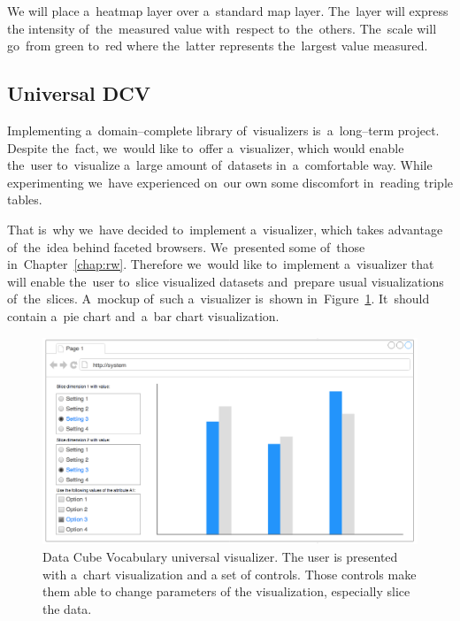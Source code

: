 We will place a~heatmap layer over a~standard map layer. The~layer will express 
the intensity of~the~measured value with~respect to~the~others. The~scale will go~from 
green to~red where the~latter represents the~largest value measured.

\subsection{Universal DCV}
Implementing a~domain--complete library of~visualizers is~a~long--term project. 
Despite the~fact, we~would like to~offer a~visualizer, which would enable the~user to~visualize a~large amount of~datasets in~a~comfortable way. While
experimenting we~have experienced on~our own some discomfort in~reading triple tables.

That is~why we~have decided to~implement a~visualizer, which takes advantage of~the~idea behind faceted browsers. We~presented some of~those in~Chapter~\ref{chap:rw}. Therefore we~would like to~implement a~visualizer that will 
enable the~user to~slice visualized datasets and~prepare usual visualizations of~the~slices. A~mockup of~such a~visualizer is~shown in~Figure~\ref{fig:dcv-universal}. It~should contain a~pie chart and~a~bar chart 
visualization.

\begin{figure}
	\centering
	\includegraphics[width=140mm]{img/dcv-universal.png}
	\caption{Data Cube Vocabulary universal visualizer. The user is presented
	with a~chart visualization and a set of controls. Those controls make them
	able to change parameters of the visualization, especially slice the data.}
	\label{fig:dcv-universal}
\end{figure}



